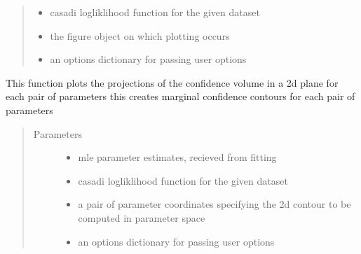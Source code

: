 \documentclass[letterpaper,10pt,english,openany,oneside]{sphinxmanual}
\begin{document}
\begin{fulllineitems}
\begin{fulllineitems}
\begin{quote}
\begin{description}
\begin{itemize}
\item {} 
 \textendash{} casadi logliklihood function for the given dataset

\item {} 
 \textendash{} the figure object on which plotting occurs

\item {} 
 \textendash{} an options dictionary for passing user options

\end{itemize}

\end{description}\end{quote}

\end{fulllineitems}


\begin{fulllineitems}
\label{\detokenize{nloed:nloed.model.Model.__contourtrace}}
This function plots the projections of the confidence volume in a 2d plane for each pair of parameters
this creates marginal confidence contours for each pair of parameters
\begin{quote}\begin{description}
\item[{Parameters}] \leavevmode\begin{itemize}
\item {} 
 \textendash{} mle parameter estimates,  recieved from fitting

\item {} 
 \textendash{} casadi logliklihood function for the given dataset

\item {} 
 \textendash{} a pair of parameter coordinates specifying the 2d contour to be computed in parameter space

\item {} 
 \textendash{} an options dictionary for passing user options


\end{itemize}
\end{description}
\end{quote}
\end{fulllineitems}
\end{fulllineitems}
\end{document}
